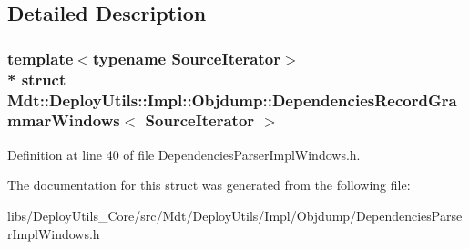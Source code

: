\subsection{Detailed Description}
\subsubsection*{template$<$typename Source\+Iterator$>$\\*
struct Mdt\+::\+Deploy\+Utils\+::\+Impl\+::\+Objdump\+::\+Dependencies\+Record\+Grammar\+Windows$<$ Source\+Iterator $>$}



Definition at line 40 of file Dependencies\+Parser\+Impl\+Windows.\+h.



The documentation for this struct was generated from the following file\+:\begin{DoxyCompactItemize}
\item 
libs/\+Deploy\+Utils\+\_\+\+Core/src/\+Mdt/\+Deploy\+Utils/\+Impl/\+Objdump/Dependencies\+Parser\+Impl\+Windows.\+h\end{DoxyCompactItemize}
